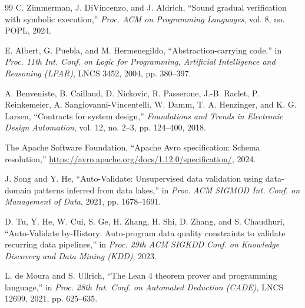 \begin{thebibliography}{99}
C. Zimmerman, J. DiVincenzo, and J. Aldrich, ``Sound gradual verification with symbolic execution,''
\emph{Proc. ACM on Programming Languages}, vol. 8, no. POPL, 2024.

E. Albert, G. Puebla, and M. Hermenegildo, ``Abstraction-carrying code,'' in \emph{Proc. 11th Int.
Conf. on Logic for Programming, Artificial Intelligence and Reasoning (LPAR)}, LNCS 3452, 2004,
pp. 380--397.

A. Benveniste, B. Caillaud, D. Nickovic, R. Passerone, J.-B. Raclet, P. Reinkemeier,
A. Sangiovanni-Vincentelli, W. Damm, T. A. Henzinger, and K. G. Larsen, ``Contracts for system
design,'' \emph{Foundations and Trends in Electronic Design Automation}, vol. 12, no. 2--3,
pp. 124--400, 2018.

The Apache Software Foundation, ``Apache Avro specification: Schema resolution,''
\url{https://avro.apache.org/docs/1.12.0/specification/}, 2024.

J. Song and Y. He, ``Auto-Validate: Unsupervised data validation using data-domain patterns inferred
from data lakes,'' in \emph{Proc. ACM SIGMOD Int. Conf. on Management of Data}, 2021,
pp. 1678--1691.

D. Tu, Y. He, W. Cui, S. Ge, H. Zhang, H. Shi, D. Zhang, and S. Chaudhuri, ``Auto-Validate
by-History: Auto-program data quality constraints to validate recurring data pipelines,'' in
\emph{Proc. 29th ACM SIGKDD Conf. on Knowledge Discovery and Data Mining (KDD)}, 2023.

L. de Moura and S. Ullrich, ``The Lean 4 theorem prover and programming language,'' in \emph{Proc.
28th Int. Conf. on Automated Deduction (CADE)}, LNCS 12699, 2021, pp. 625--635.

\end{thebibliography}
